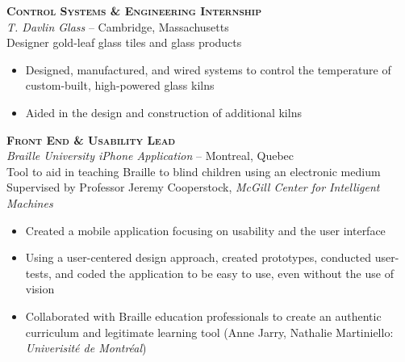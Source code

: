 \documentclass[12pt, letterpaper]{article}
\newcommand{\years}[1]{\marginnote{\footnotesize #1}} %
\begin{document}

	\begin{samepage}
		\years{Summer 2013} \textbf{\scshape Control Systems \& Engineering Internship}\\
		\textit{T. Davlin Glass} -- Cambridge, Massachusetts\\
		{\small Designer gold-leaf glass tiles and glass products}
		\begin{itemize}
			\item Designed, manufactured, and wired systems to control the temperature of custom-built, high-powered glass kilns
			\item Aided in the design and construction of additional kilns
		\end{itemize}
	\end {samepage}
	\vspace{.1in}

	\begin{samepage}
		\years{1/2013 - 8/2013} \textbf{\scshape Front End \& Usability Lead}\\
		\textit{Braille University iPhone Application} -- Montreal, Quebec\\
		Tool to aid in teaching Braille to blind children using an electronic medium\\
		{\small Supervised by Professor Jeremy Cooperstock, \textsl {McGill Center for Intelligent Machines}}
		\begin{itemize}
			\item Created a mobile application focusing on usability and the user interface
			\item Using a user-centered design approach, created prototypes, conducted user-tests, and coded the application to be easy to use, even without the use of vision
			\item Collaborated with Braille education professionals to create an authentic curriculum and legitimate learning tool (Anne Jarry, Nathalie Martiniello: \textit {Univerisit\'e de Montr\'eal})
		\end{itemize}
	\end {samepage}
\vspace{.1in}

\clearpage
\end{document}
